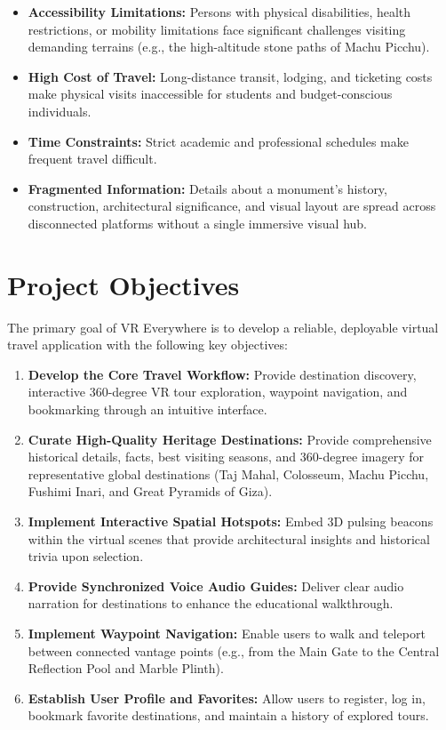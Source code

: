 \documentclass{tietreport}
\begin{document}
\begin{itemize}
  \item \textbf{Accessibility Limitations:} Persons with physical disabilities, health restrictions, or mobility limitations face significant challenges visiting demanding terrains (e.g., the high-altitude stone paths of Machu Picchu).
  \item \textbf{High Cost of Travel:} Long-distance transit, lodging, and ticketing costs make physical visits inaccessible for students and budget-conscious individuals.
  \item \textbf{Time Constraints:} Strict academic and professional schedules make frequent travel difficult.
  \item \textbf{Fragmented Information:} Details about a monument's history, construction, architectural significance, and visual layout are spread across disconnected platforms without a single immersive visual hub.
\end{itemize}

\section{Project Objectives}

The primary goal of VR Everywhere is to develop a reliable, deployable virtual travel application with the following key objectives:

\begin{enumerate}
  \item \textbf{Develop the Core Travel Workflow:} Provide destination discovery, interactive 360-degree VR tour exploration, waypoint navigation, and bookmarking through an intuitive interface.
  \item \textbf{Curate High-Quality Heritage Destinations:} Provide comprehensive historical details, facts, best visiting seasons, and 360-degree imagery for representative global destinations (Taj Mahal, Colosseum, Machu Picchu, Fushimi Inari, and Great Pyramids of Giza).
  \item \textbf{Implement Interactive Spatial Hotspots:} Embed 3D pulsing beacons within the virtual scenes that provide architectural insights and historical trivia upon selection.
  \item \textbf{Provide Synchronized Voice Audio Guides:} Deliver clear audio narration for destinations to enhance the educational walkthrough.
  \item \textbf{Implement Waypoint Navigation:} Enable users to walk and teleport between connected vantage points (e.g., from the Main Gate to the Central Reflection Pool and Marble Plinth).
  \item \textbf{Establish User Profile and Favorites:} Allow users to register, log in, bookmark favorite destinations, and maintain a history of explored tours.
\end{enumerate}
\end{document}
